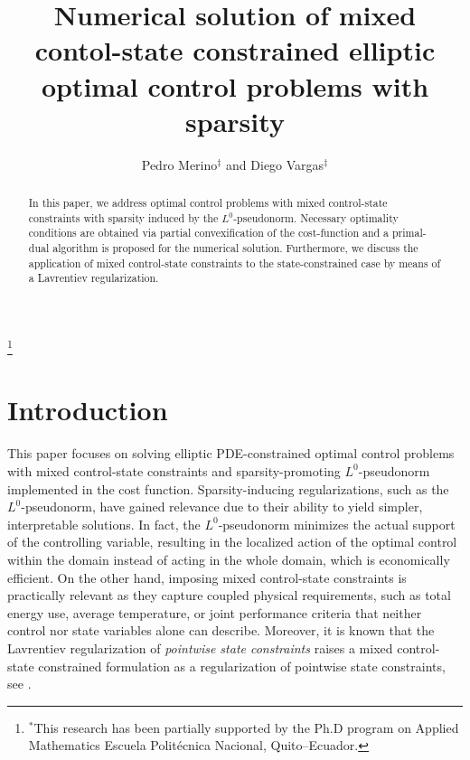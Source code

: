 \documentclass[11pt,a4paper]{amsart}
\begin{document}
	\title[Sparse state-constrained optimal control]{ Numerical solution of mixed contol-state constrained elliptic optimal control problems with sparsity}
	
	\author{Pedro Merino$^\ddag$ and Diego Vargas$^\ddag$}
	\address{$^\ddag$Research Center of Mathematical Modeling (MODEMAT) and Escuela Polit\'ecnica Nacional, Quito, Ecuador}
	\keywords{}
	\thanks{$^*$This research has been partially supported by the  Ph.D program on Applied Mathematics Escuela Polit\'ecnica Nacional, Quito--Ecuador.}
	
	\smallskip
\begin{abstract}
In this paper, we address optimal control problems with mixed control-state constraints with sparsity induced by the $L^0$-pseudonorm. Necessary optimality conditions are obtained via partial convexification of the cost-function and a primal-dual algorithm is proposed for the numerical solution. Furthermore, we discuss the application of mixed control-state constraints to the state-constrained case by means of a Lavrentiev regularization.
\end{abstract}
	
\maketitle 

\section{Introduction}

 This paper focuses on solving elliptic PDE-constrained optimal control problems with mixed control-state constraints and sparsity-promoting $L^0$-pseudonorm implemented in the cost function.  Sparsity-inducing regularizations, such as the $L^0$-pseudonorm, have gained relevance due to their ability to yield simpler, interpretable solutions. In fact, the $L^0$-pseudonorm minimizes the actual support of the controlling variable, resulting in the localized action of the optimal control within the domain instead of acting in the whole domain, which is economically efficient.   
On the other hand, imposing mixed control-state constraints is practically relevant as they capture coupled physical requirements, such as total energy use, average temperature, or joint performance criteria that neither control nor state variables alone can describe. Moreover, it is known that the Lavrentiev regularization of \emph{pointwise state constraints} raises a mixed control-state constrained formulation as a regularization of pointwise state constraints, see \cite{meyer06} . 
\end{document}
